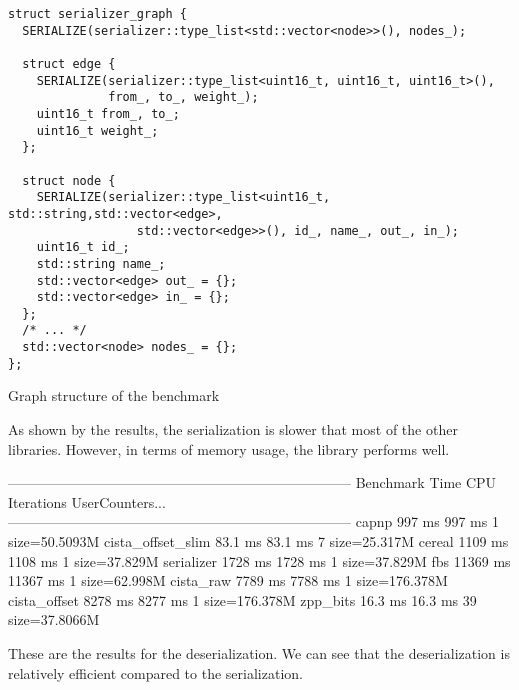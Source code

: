 \begin{listing}[ht!]
\begin{verbatim}
struct serializer_graph {
  SERIALIZE(serializer::type_list<std::vector<node>>(), nodes_);

  struct edge {
    SERIALIZE(serializer::type_list<uint16_t, uint16_t, uint16_t>(),
              from_, to_, weight_);
    uint16_t from_, to_;
    uint16_t weight_;
  };

  struct node {
    SERIALIZE(serializer::type_list<uint16_t, std::string,std::vector<edge>,
                  std::vector<edge>>(), id_, name_, out_, in_);
    uint16_t id_;
    std::string name_;
    std::vector<edge> out_ = {};
    std::vector<edge> in_ = {};
  };
  /* ... */
  std::vector<node> nodes_ = {};
};
\end{verbatim}
\caption{Graph structure of the benchmark}
\label{lst:graph}
\end{listing}

As shown by the results, the serialization is slower that most of the other
libraries. However, in terms of memory usage, the library performs well.

\begin{terminal}
--------------------------------------------------------------------------
Benchmark                Time             CPU   Iterations UserCounters...
--------------------------------------------------------------------------
capnp                  997 ms          997 ms            1 size=50.5093M
cista_offset_slim     83.1 ms         83.1 ms            7 size=25.317M
cereal                1109 ms         1108 ms            1 size=37.829M
serializer            1728 ms         1728 ms            1 size=37.829M
fbs                  11369 ms        11367 ms            1 size=62.998M
cista_raw             7789 ms         7788 ms            1 size=176.378M
cista_offset          8278 ms         8277 ms            1 size=176.378M
zpp_bits              16.3 ms         16.3 ms           39 size=37.8066M
\end{terminal}\leavevmode\newline

These are the results for the deserialization. We can see that the
deserialization is relatively efficient compared to the serialization.

